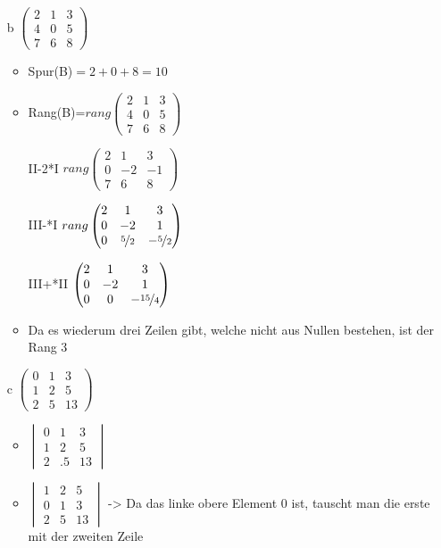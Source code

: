 \documentclass{article}
\begin{document}
\begin{itemize}
\begin{itemize}
\begin{itemize}
			\end{itemize}
			\item[b]{$\begin{pmatrix} 2 & 1 & 3 \\ 4 & 0 & 5 \\ 7 & 6 & 8 \end{pmatrix}$}
			\begin{itemize}
				\item{Spur(B)$=2+0+8=10$}
				\item{Rang(B)=$rang \begin{pmatrix} 2 & 1 & 3 \\ 4 & 0 & 5 \\ 7 & 6 & 8 \end{pmatrix}$}
				\item[II-2*I]{$rang \begin{pmatrix} 2 & 1 & 3 \\ 0 & -2 & -1 \\ 7 & 6 & 8 \end{pmatrix}$}
				\item[III-\nicefrac{7}{2}*I]{$rang \begin{pmatrix} 2 & 1 & 3 \\ 0 & -2 & 1 \\ 0 & \nicefrac{5}{2} & -\nicefrac{5}{2} \end{pmatrix}$}
				\item[III+\nicefrac{5}{4}*II]{$\begin{pmatrix} 2 & 1 & 3 \\ 0 & -2 & 1 \\ 0 & 0 & -\nicefrac{15}{4} \end{pmatrix}$}
				\item{Da es wiederum drei Zeilen gibt, welche nicht aus Nullen bestehen, ist der Rang 3}
			\end{itemize}
			\item[c]{$\begin{pmatrix} 0 & 1 & 3 \\ 1 & 2 & 5 \\ 2 & 5 & 13 \end{pmatrix}$}
			\begin{itemize}
				\item{$\begin{vmatrix} 0 & 1 & 3 \\ 1 & 2 & 5 \\ 2 &.5 & 13 \end{vmatrix}$}
				\item{$\begin{vmatrix} 1 & 2 & 5 \\ 0 & 1 & 3 \\ 2 & 5 & 13 \end{vmatrix}$ -> Da das linke obere Element 0 ist, tauscht man die erste mit der zweiten Zeile}

\end{itemize}
\end{itemize}
\end{itemize}
\end{document}
